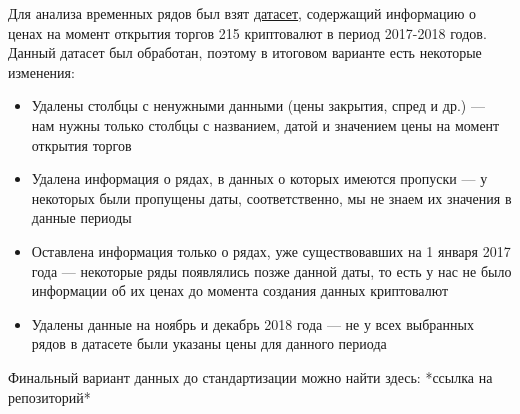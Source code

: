 Для анализа временных рядов был взят \href{https://www.kaggle.com/jessevent/all-crypto-currencies}{датасет}, содержащий информацию о ценах на момент открытия торгов 215 криптовалют в период 2017-2018 годов. Данный датасет был обработан, поэтому в итоговом варианте есть некоторые изменения:
\begin{itemize}
	\item Удалены столбцы с ненужными данными (цены закрытия, спред и др.) --- нам нужны только столбцы с названием, датой и значением цены на момент открытия торгов
	\item Удалена информация о рядах, в данных о которых имеются пропуски --- у некоторых были пропущены даты, соответственно, мы не знаем их значения в данные периоды
	\item Оставлена информация только о рядах, уже существовавших на 1 января 2017 года --- некоторые ряды появлялись позже данной даты, то есть у нас не было информации об их ценах до момента создания данных криптовалют
	\item Удалены данные на ноябрь и декабрь 2018 года --- не у всех выбранных рядов в датасете были указаны цены для данного периода
\end{itemize}


Финальный вариант данных до стандартизации можно найти здесь: *ссылка на репозиторий*